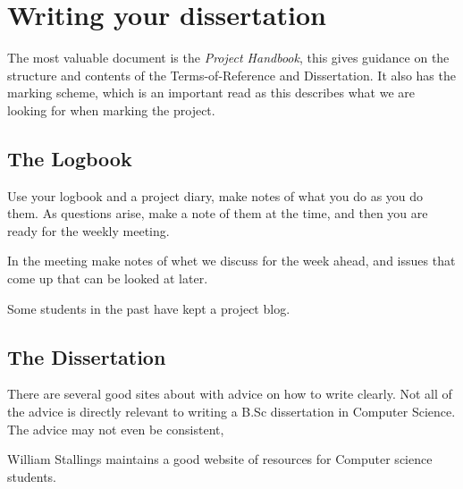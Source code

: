  \section{Writing your dissertation}
 
The most valuable document is the \emph{Project Handbook}, this gives guidance
on the structure and contents of the Terms-of-Reference and Dissertation.  It
also has the marking scheme, which is an important read as this describes what
we are looking for when marking the project.

\subsection{The Logbook}
Use your logbook and a project diary, make notes of what you do as you do
them.  As questions arise, make a note of them at the time, and then you are
ready for the weekly meeting.

In the meeting make notes of whet we discuss for the week ahead, and issues
that come up that can be looked at later.

Some students in the past have kept a project blog.

\subsection{The Dissertation} 
There are several good sites about with advice on how to write clearly.  Not
all of the advice is directly relevant to writing a B.Sc dissertation in
Computer Science.  The advice may not even be consistent, 

William Stallings \citep{Stallings} maintains a good website of resources for
Computer science students.

